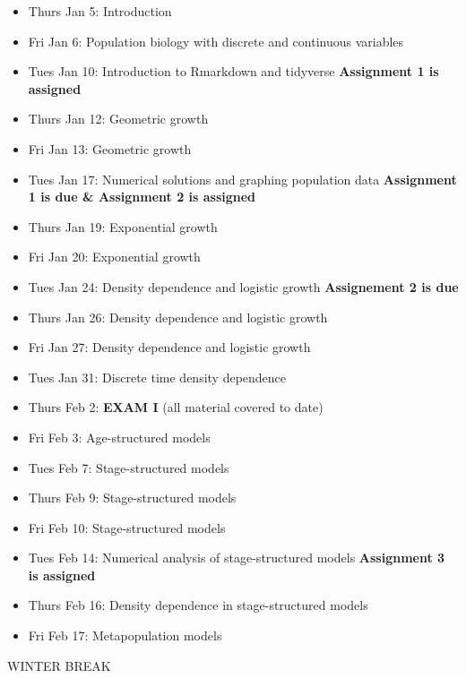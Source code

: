 \documentclass[
]{book}
\providecommand{\tightlist}{%
  \setlength{\itemsep}{0pt}\setlength{\parskip}{0pt}}
\begin{document}
\begin{itemize}
\tightlist
\item
  Thurs Jan 5: Introduction
\item
  Fri Jan 6: Population biology with discrete and continuous variables
\item
  Tues Jan 10: Introduction to Rmarkdown and tidyverse \textbf{Assignment 1 is assigned}
\item
  Thurs Jan 12: Geometric growth
\item
  Fri Jan 13: Geometric growth
\item
  Tues Jan 17: Numerical solutions and graphing population data \textbf{Assignment 1 is due \& Assignment 2 is assigned}
\item
  Thurs Jan 19: Exponential growth
\item
  Fri Jan 20: Exponential growth
\item
  Tues Jan 24: Density dependence and logistic growth
  \textbf{Assignement 2 is due}
\item
  Thurs Jan 26: Density dependence and logistic growth
\item
  Fri Jan 27: Density dependence and logistic growth
\item
  Tues Jan 31: Discrete time density dependence
\item
  Thurs Feb 2: \textbf{EXAM I} (all material covered to date)
\item
  Fri Feb 3: Age-structured models
\item
  Tues Feb 7: Stage-structured models
\item
  Thurs Feb 9: Stage-structured models
\item
  Fri Feb 10: Stage-structured models
\item
  Tues Feb 14: Numerical analysis of stage-structured models \textbf{Assignment 3 is assigned}
\item
  Thurs Feb 16: Density dependence in stage-structured models
\item
  Fri Feb 17: Metapopulation models
\end{itemize}

WINTER BREAK
\end{document}

